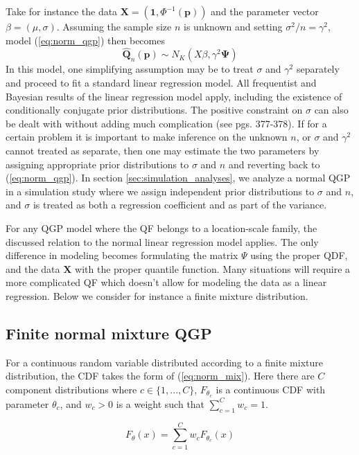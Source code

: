 \documentclass[preprint,12pt,authoryear]{elsarticle}
\begin{document}
Take for instance the data $\boldsymbol{X} = \left(\textbf{1}, \Phi^{-1}(\boldsymbol{p})\right)$ and the parameter vector $\beta = (\mu, \sigma)$. Assuming the sample size $n$ is unknown and setting $\sigma^2/n = \gamma^2$, model (\ref{eq:norm_qgp}) then becomes
\[
    \hat{\boldsymbol{Q}}_n(\boldsymbol{p}) \sim N_K\left(X\beta, 
\gamma^2 \boldsymbol{\Psi}\right)
\]
In this model, one simplifying assumption may be to treat $\sigma$ and $\gamma^2$ separately and proceed to fit a standard linear regression model. All frequentist and Bayesian results of the linear regression model apply, including the existence of conditionally conjugate prior distributions. The positive constraint on $\sigma$ can also be dealt with without adding much complication (see \cite{gelman2013bayesian} pgs. 377-378). If for a certain problem it is important to make inference on the unknown $n$, or $\sigma$ and $\gamma^2$ cannot treated as separate, then one may estimate the two parameters by assigning appropriate prior distributions to $\sigma$ and $n$ and reverting back to (\ref{eq:norm_qgp}). In section \ref{sec:simulation_analyses}, we analyze a normal QGP in a simulation study where we assign independent prior distributions to $\sigma$ and $n$, and $\sigma$ is treated as both a regression coefficient and as part of the variance.



For any QGP model where the QF belongs to a location-scale family, the discussed relation to the normal linear regression model applies. The only difference in modeling becomes formulating the matrix $\Psi$ using the proper QDF, and the data $\boldsymbol{X}$ with the proper quantile function. Many situations will require a more complicated QF which doesn't allow for modeling the data as a linear regression. Below we consider for instance a finite mixture distribution. 

\subsection{Finite normal mixture QGP}

For a continuous random variable distributed according to a finite mixture distribution, the CDF takes the form of (\ref{eq:norm_mix}). Here there are $C$ component distributions where $c \in \{1, ..., C\}$, $F_{\theta_c}$ is a continuous CDF with parameter $\theta_c$, and $w_c > 0$ is a weight such that $\sum_{c = 1}^C w_c = 1$. 

\begin{equation}
    \label{eq:norm_mix}
    F_{\theta}(x) = \sum_{c = 1}^C w_c F_{\theta_c}(x)
\end{equation}
\end{document}
